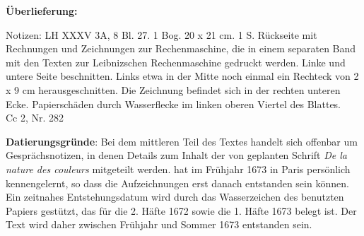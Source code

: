   
        
        \begin{ledgroupsized}[r]{120mm}
        \footnotesize 
        \pstart        
        \noindent\textbf{\"{U}berlieferung:}  
        \pend
        \end{ledgroupsized}
      
       
              \begin{ledgroupsized}[r]{114mm}
              \footnotesize 
              \pstart \parindent -6mm
              Notizen: LH XXXV 3A, 8 Bl. 27. 1 Bog. 20 x 21 cm. 1 S. R\"{u}ckseite mit Rechnungen und Zeichnungen zur Rechenmaschine, die in einem separaten Band mit den Texten zur Leibnizschen Rechenmaschine gedruckt werden. Linke und untere Seite beschnitten. Links etwa in der Mitte noch einmal ein Rechteck von 2 x 9 cm herausgeschnitten. Die Zeichnung befindet sich in der rechten unteren Ecke. Papiersch\"{a}den durch Wasserflecke im linken oberen Viertel des Blattes.\\Cc 2, Nr. 282 \pend
              \end{ledgroupsized}
        \vspace*{5mm}
        \begin{ledgroup}
        \footnotesize 
        \pstart
      \noindent\footnotesize{\textbf{Datierungsgr\"{u}nde}: Bei dem mittleren Teil des Textes handelt sich offenbar um Gespr\"{a}chsnotizen, in denen Details zum Inhalt der von \protect{} geplanten Schrift \cite{00186}\textit{De la nature des couleurs} mitgeteilt werden. \protect{} hat \protect{} im Fr\"{u}hjahr 1673 in Paris pers\"{o}nlich kennengelernt, so dass die Aufzeichnungen erst danach entstanden sein k\"{o}nnen. Ein zeitnahes Entstehungsdatum wird durch das Wasserzeichen des benutzten Papiers gest\"{u}tzt, das f\"{u}r die 2. H\"{a}fte 1672 sowie die 1. H\"{a}fte 1673 belegt ist. Der Text wird daher zwischen Fr\"{u}hjahr und Sommer 1673 entstanden sein.}
        \pend
        \end{ledgroup}
      
